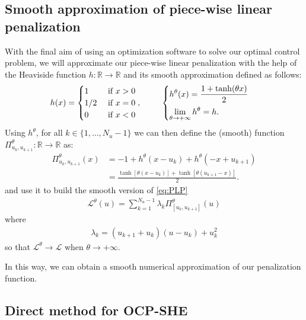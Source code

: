 \documentclass[twocolumn]{autart}    %
\begin{document}
\subsection{Smooth approximation of piece-wise linear penalization}

With the final aim of using an optimization software to solve our optimal control problem, we will approximate our piece-wise linear penalization with the help of the Heaviside function $h:\mathbb{R} \rightarrow \mathbb{R}$ and its smooth approximation defined as follows: 
\begin{align*}
    h(x) = \begin{cases}
        1 & \text{ if } x > 0 \\
		1/2 & \text{ if } x = 0\\
		 0 & \text{ if } x < 0
    \end{cases},    
    \hspace{2.5em} 
    \begin{cases}
        \displaystyle h^\theta(x) = \frac{1 + \tanh(\theta x)}{2} \\[7pt] \displaystyle \lim_{\theta\to +\infty} h^\theta = h.
    \end{cases}
\end{align*}
Using $h^\theta$, for all $k \in \{1,\dots,N_u-1\}$ we can then define the (smooth) function $\Pi_{u_k,u_{k+1}}^\theta:\mathbb{R} \rightarrow \mathbb{R}$ as:
\begin{align*}
    \Pi_{u_k,u_{k+1}}^\theta(x) &= - 1 + h^\theta(x-u_k) + h^\theta(-x+u_{k+1}) 
    \\[5pt]
    &= \frac{\tanh[\theta(x-u_k)] + \tanh[\theta (u_{k+1}-x)]}{2}.
\end{align*}
and use it to build the smooth version of \eqref{eq:PLP}
\begin{align*}
    \mathcal{L}^\theta(u) = \sum_{k = 1}^{N_u-1} \lambda_k \Pi^\theta_{[u_k,u_{k+1}]}(u)
\end{align*}
where 
\begin{gather}
	\lambda_k = (u_{k+1}+u_{k}) (u-u_k) + u_k^2 
\end{gather}
so that $\mathcal{L}^\theta \rightarrow \mathcal{L}$ when $\theta \rightarrow +\infty$. 

In this way, we can obtain a smooth numerical approximation of our penalization function.

\subsection{Direct method  for  OCP-SHE}
\end{document}

